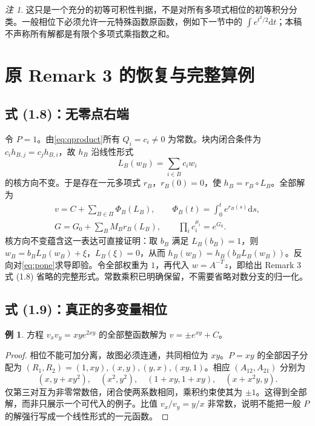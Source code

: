 \documentclass[UTF8,11pt,a4paper,fontset=fandol]{ctexart}
\theoremstyle{definition}\newtheorem{definition}[theorem]{定义}
\newtheorem{example}[theorem]{例}
\theoremstyle{remark}\newtheorem{remark}[theorem]{注}
\newcommand{\dd}{\mathrm d}\newcommand{\OO}{\mathcal O}
\begin{document}
\begin{remark}
这只是一个充分的初等可积性判据，不是对所有多项式相位的初等积分分类。一般相位下必须允许一元特殊函数原函数，例如下一节中的 $\int e^{t^2/2}\dd t$；本稿不声称所有解都是有限个多项式乘指数之和。
\end{remark}

\section{原 Remark 3 的恢复与完整算例}\label{sec:examples}
\subsection{式 (1.8)：无零点右端}
令 $P=1$。由\eqref{eq:qproduct}所有 $Q_i=c_i\ne0$ 为常数。块内闭合条件为 $c_i h_{B,j}=c_j h_{B,i}$，故 $h_B$ 沿线性形式
\[
L_B(w_B)=\sum_{i\in B}c_iw_i
\]
的核方向不变。于是存在一元多项式 $r_B$，$r_B(0)=0$，使 $h_B=r_B\circ L_B$。全部解为
\begin{equation}\label{eq:pone}
\begin{gathered}
v=C+\sum_{B\in\Pi}\Phi_B(L_B),\qquad
\Phi_B(t)=\int_0^t e^{r_B(s)}\dd s,\\
G=G_0+\sum_BM_Br_B(L_B),\qquad
\prod_i c_i^{\mu_i}=e^{G_0}.
\end{gathered}
\end{equation}
核方向不变蕴含这一表达可直接证明：取 $b_B$ 满足 $L_B(b_B)=1$，则 $w_B=b_BL_B(w_B)+\xi$，$L_B(\xi)=0$，从而 $h_B(w_B)=h_B(b_BL_B(w_B))$。反向对\eqref{eq:pone}求导即验。令全部权重为 $1$，再代入 $w=A^{-T}z$，即给出 Remark 3 式 (1.8) 省略的完整形式。常数乘积已明确保留，不需要省略对数分支的归一化。

\subsection{式 (1.9)：真正的多变量相位}
\begin{example}
方程 $v_xv_y=xy e^{2xy}$ 的全部整函数解为 $v=\pm e^{xy}+C$。
\end{example}
\begin{proof}
相位不能可加分离，故图必须连通，共同相位为 $xy$。$P=xy$ 的全部因子分配为 $(R_1,R_2)=(1,xy),(x,y),(y,x),(xy,1)$。相应 $(A_{12},A_{21})$ 分别为
\[
(x,y+xy^2),\quad(x^2,y^2),\quad(1+xy,1+xy),\quad(x+x^2y,y).
\]
仅第三对互为非零常数倍，闭合使两系数相同，乘积约束使其为 $\pm1$。这得到全部解，而非只展示一个可代入的例子。比值 $v_x/v_y=y/x$ 非常数，说明不能把一般 $P$ 的解强行写成一个线性形式的一元函数。
\end{proof}
\end{document}
